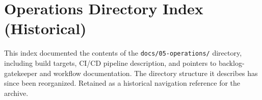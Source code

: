 
\section*{Operations Directory Index (Historical)}

This index documented the contents of the \texttt{docs/05-operations/}
directory, including build targets, CI/CD pipeline description, and pointers to
backlog-gatekeeper and workflow documentation. The directory structure it
describes has since been reorganized. Retained as a historical navigation
reference for the archive.
